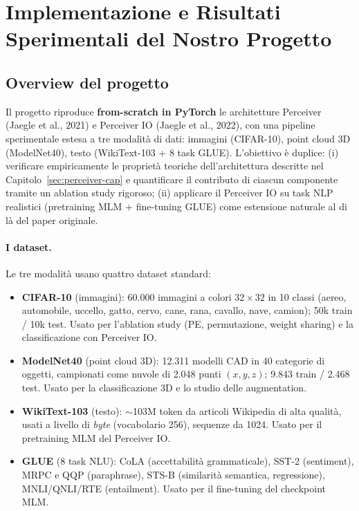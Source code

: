 \documentclass[
  11pt,
]{article}
\begin{document}
\section{Implementazione e Risultati Sperimentali del Nostro Progetto}
\label{sec:progetto}

\subsection{Overview del progetto}
\label{sec:progetto-overview}

Il progetto riproduce \textbf{from-scratch in PyTorch} le architetture Perceiver (Jaegle et al., 2021) e Perceiver IO (Jaegle et al., 2022), con una pipeline sperimentale estesa a tre modalità di dati: immagini (CIFAR-10), point cloud 3D (ModelNet40), testo (WikiText-103 + 8 task GLUE). L'obiettivo è duplice: (i) verificare empiricamente le proprietà teoriche dell'architettura descritte nel Capitolo~\ref{sec:perceiver-cap} e quantificare il contributo di ciascun componente tramite un ablation study rigoroso; (ii) applicare il Perceiver IO su task NLP realistici (pretraining MLM + fine-tuning GLUE) come estensione naturale al di là del paper originale.

\paragraph{I dataset.} Le tre modalità usano quattro dataset standard:
\begin{itemize}
\item \textbf{CIFAR-10} (immagini): 60.000 immagini a colori $32\times32$ in 10 classi (aereo, automobile, uccello, gatto, cervo, cane, rana, cavallo, nave, camion); 50k train / 10k test. Usato per l'ablation study (PE, permutazione, weight sharing) e la classificazione con Perceiver IO.
\item \textbf{ModelNet40} (point cloud 3D): 12.311 modelli CAD in 40 categorie di oggetti, campionati come nuvole di 2.048 punti $(x,y,z)$; 9.843 train / 2.468 test. Usato per la classificazione 3D e lo studio delle augmentation.
\item \textbf{WikiText-103} (testo): $\sim$103M token da articoli Wikipedia di alta qualità, usati a livello di \emph{byte} (vocabolario 256), sequenze da 1024. Usato per il pretraining MLM del Perceiver IO.
\item \textbf{GLUE} (8 task NLU): CoLA (accettabilità grammaticale), SST-2 (sentiment), MRPC e QQP (paraphrase), STS-B (similarità semantica, regressione), MNLI/QNLI/RTE (entailment). Usato per il fine-tuning del checkpoint MLM.
\end{itemize}
\end{document}
